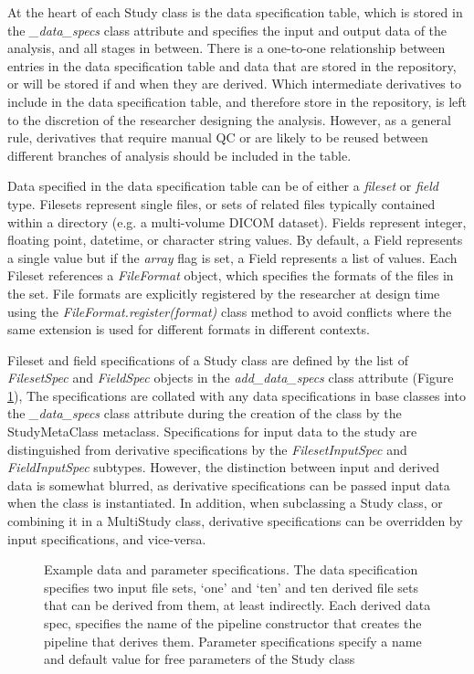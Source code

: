 \documentclass[smallextended]{svjour3}       %
\begin{document}
At the heart of each Study class is the data specification table, which
is stored in the \emph{\_data\_specs} class attribute and specifies the
input and output data of the analysis, and all
stages in between. There is a one-to-one relationship between entries in
the data specification table and data that are stored in the repository,
or will be stored if and when they are derived. Which intermediate
derivatives to include in the data specification table, and therefore
store in the repository, is left to the discretion of the researcher
designing the analysis. However, as a general rule, derivatives that
require manual QC or are likely to be reused between different branches
of analysis should be included in the table.

Data specified in the data specification table can be of either a
\emph{fileset} or \emph{field} type. Filesets represent single files,
or sets of related files typically contained within a directory
(e.g. a multi-volume DICOM dataset). Fields
represent integer, floating point, datetime, or character string
values. By default, a Field represents a single value but if the \emph{array}
flag is set, a Field represents a list of values.
Each Fileset references a \emph{FileFormat} object, which
specifies the formats of the files in the set. File formats are
explicitly registered by the researcher at design time using the
\emph{FileFormat.register(format)} class method to avoid conflicts where
the same extension is used for different formats in different contexts.

Fileset and field specifications of a Study class are defined by the
list of \emph{FilesetSpec} and \emph{FieldSpec} objects in the
\emph{add\_data\_specs} class attribute (Figure \ref{fig:data_spec}),
The specifications are collated with any data specifications in base
classes into the \emph{\_data\_specs} class attribute during the creation
of the class by the StudyMetaClass metaclass.
Specifications for input data to the study are
distinguished from derivative specifications by the \emph{FilesetInputSpec}
and \emph{FieldInputSpec} subtypes. However, the distinction between
input and derived data is somewhat blurred, as derivative specifications can be
passed input data when the class is instantiated. In addition,
when subclassing a Study class, or combining it in a MultiStudy class,
derivative specifications can be overridden by input
specifications, and vice-versa.

\begin{figure}

\caption{Example data and parameter specifications. The data
specification specifies two input file sets, `one' and `ten' and
ten derived file sets that can be derived from them, at least
indirectly. Each derived data spec, specifies the name of the pipeline
constructor that creates the pipeline that derives them. Parameter
specifications specify a name and default value for free parameters of
the Study class}
\label{fig:data_spec}
\end{figure}
\end{document}

